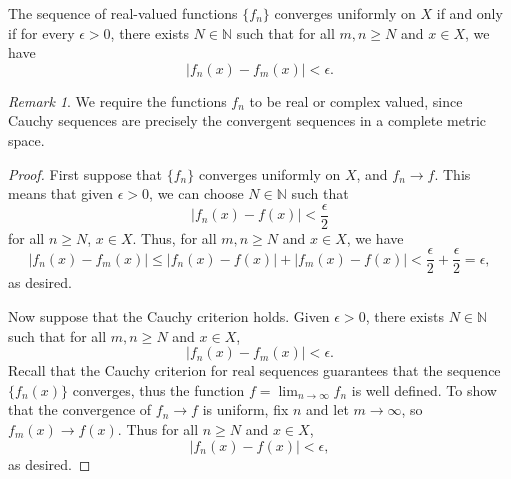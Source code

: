 \documentclass[11pt]{article}
\def\N{\mathbb{N}}
\theoremstyle{definition}
\theoremstyle{remark}
\newtheorem*{remark}{Remark}
\numberwithin{equation}{module}
\begin{document}
    \begin{theorem}
        The sequence of real-valued functions $\{f_n\}$ converges uniformly on $X$
        if and only if for every $\epsilon > 0$, there exists $N \in \N$ such that
        for all $m, n \geq N$ and $x \in X$, we have \[
            |f_n(x) - f_m(x)| < \epsilon.
        \] 
        \begin{remark}
            We require the functions $f_n$ to be real or complex valued, since
            Cauchy sequences are precisely the convergent sequences in a complete
            metric space.
        \end{remark}
    \end{theorem}
    \begin{proof}
        First suppose that $\{f_n\}$ converges uniformly on $X$, and $f_n \to f$.
        This means that given $\epsilon > 0$, we can choose $N \in \N$ such that \[
            |f_n(x) - f(x)| < \frac{\epsilon}{2}
        \] for all $n \geq N$, $x \in X$.
        Thus, for all $m, n \geq N$ and $x \in X$, we have \[
            |f_n(x) - f_m(x)| \leq |f_n(x) - f(x)| + |f_m(x) - f(x)| <
            \frac{\epsilon}{2} + \frac{\epsilon}{2} = \epsilon,
        \] as desired.

        Now suppose that the Cauchy criterion holds. Given $\epsilon > 0$,
        there exists $N \in \N$ such that for all $m, n \geq N$ and $x \in X$, \[
            |f_n(x) - f_m(x)| < \epsilon.
        \]
        Recall that the Cauchy criterion for real sequences guarantees that the
        sequence $\{f_n(x)\}$ converges, thus the function
        $f = \lim_{n \to \infty} f_n$ is well defined.
        To show that the convergence of $f_n \to f$ is uniform, fix $n$ and let $m
        \to \infty$, so $f_m(x) \to f(x)$. Thus for all $n \geq N$ and $x \in X$, \[
            |f_n(x) - f(x)| < \epsilon,
        \] as desired.
    \end{proof}
\end{document}
